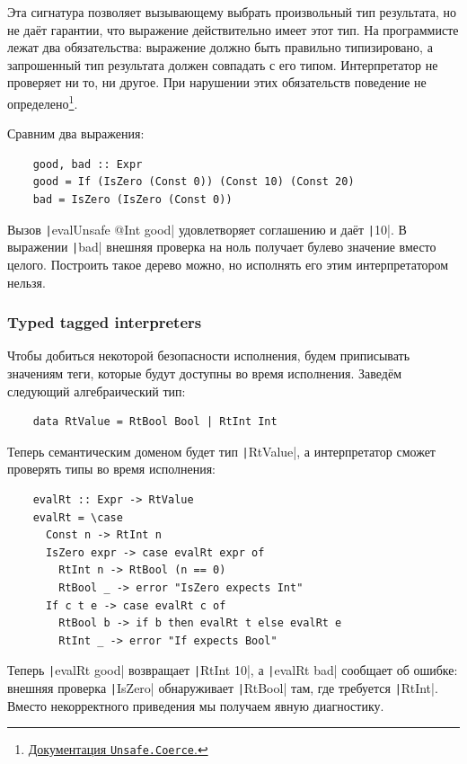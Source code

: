 Эта сигнатура позволяет вызывающему выбрать произвольный тип результата, но не даёт гарантии, что выражение действительно имеет этот тип.
На программисте лежат два обязательства: выражение должно быть правильно типизировано, а запрошенный тип результата должен совпадать с его типом.
Интерпретатор не проверяет ни то, ни другое.
При нарушении этих обязательств поведение не определено\footnote{\href{https://hackage.haskell.org/package/base/docs/Unsafe-Coerce.html}{Документация \texttt{Unsafe.Coerce}.}}.

Сравним два выражения:
\begin{verbatim}
    good, bad :: Expr
    good = If (IsZero (Const 0)) (Const 10) (Const 20)
    bad = IsZero (IsZero (Const 0))
\end{verbatim}
Вызов \texttt|evalUnsafe @Int good| удовлетворяет соглашению и даёт \texttt|10|.
В выражении \texttt|bad| внешняя проверка на ноль получает булево значение вместо целого.
Построить такое дерево можно, но исполнять его этим интерпретатором нельзя.

\subsubsection{Typed tagged interpreters}

Чтобы добиться некоторой безопасности исполнения, будем приписывать значениям теги, которые будут доступны во время исполнения.
Заведём следующий алгебраический тип:
\begin{verbatim}
    data RtValue = RtBool Bool | RtInt Int
\end{verbatim}

Теперь семантическим доменом будет тип \texttt|RtValue|, а интерпретатор сможет проверять типы во время исполнения:
\begin{verbatim}
    evalRt :: Expr -> RtValue
    evalRt = \case
      Const n -> RtInt n
      IsZero expr -> case evalRt expr of
        RtInt n -> RtBool (n == 0)
        RtBool _ -> error "IsZero expects Int"
      If c t e -> case evalRt c of
        RtBool b -> if b then evalRt t else evalRt e
        RtInt _ -> error "If expects Bool"
\end{verbatim}

Теперь \texttt|evalRt good| возвращает \texttt|RtInt 10|, а \texttt|evalRt bad| сообщает об ошибке: внешняя проверка \texttt|IsZero| обнаруживает \texttt|RtBool| там, где требуется \texttt|RtInt|.
Вместо некорректного приведения мы получаем явную диагностику.

